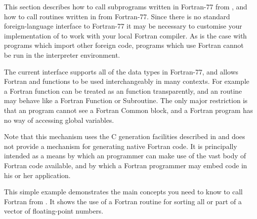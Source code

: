 \newcommand{\Cpp}{C{\tt ++}}


This section describes how to call subprograms written in Fortran-77
from \asharp, and how to call routines written in \asharp{} from
Fortran-77.   Since there is no standard foreign-language interface to
Fortran-77 it may be necessary to customise your implementation of
\asharp{} to work with your local Fortran compiler.  As is the case
with \asharp{} programs which import other foreign code, programs
which use Fortran cannot be run in the interpreter environment.

The current interface supports all of the data types in Fortran-77,
and allows Fortran and \asharp{} functions to be used interchangeably in
many contexts.  For example a Fortran function can be treated as an
\asharp{} function transparently, and an \asharp{} routine may behave
like a Fortran Function or Subroutine.  The only major restriction is
that an \asharp{} program cannot see a Fortran Common block, and a
Fortran program has no way of accessing \asharp{} global variables.

Note that this mechanism uses the C generation facilities described 
in  and does not provide a mechanism for
generating native Fortran code.  It is principally intended as a means
by which an \asharp{} programmer can make use of the vast body of Fortran
code available, and by which a Fortran programmer may embed \asharp{}
code in his or her application.


This simple example demonstrates the main concepts you need to know to
call Fortran from \asharp{}.  It shows the use of a Fortran routine
for sorting all or part of a vector of floating-point numbers.  


